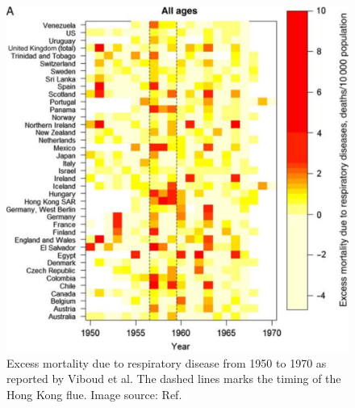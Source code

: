 \documentclass[
12pt, %
a4paper, %
oneside, %
headinclude,footinclude, %
BCOR5mm, %
]{scrartcl}
\begin{document}
\begin{figure}[h]
 \centering
 \includegraphics[width=1\linewidth]{Figures/Asiatic_HK_flu.png} 
 \caption{ Excess mortality due to respiratory disease from 1950 to 1970 as reported by Viboud et al. The dashed lines marks the timing of the Hong Kong flue. Image source: Ref.  \cite{viboud2016global}}
 \label{Asiatic_HK_flu}
\end{figure}


\clearpage
\end{document}
